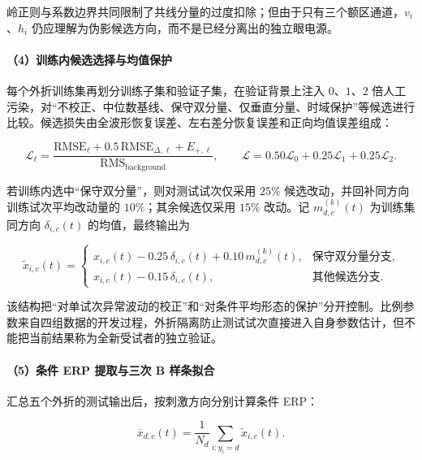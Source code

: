 \documentclass[a4paper]{ctexart}
\numberwithin{figure}{section}       %
\begin{document}
岭正则与系数边界共同限制了共线分量的过度扣除；但由于只有三个额区通道，$v_i$、$h_i$ 仍应理解为伪影候选方向，而不是已经分离出的独立眼电源。

\paragraph{（4）训练内候选选择与均值保护}

每个外折训练集再划分训练子集和验证子集，在验证背景上注入 $0$、$1$、$2$ 倍人工污染，对“不校正、中位数基线、保守双分量、仅垂直分量、时域保护”等候选进行比较。候选损失由全波形恢复误差、左右差分恢复误差和正向均值误差组成：

\begin{equation}
    \mathcal L_{\ell}=
    \frac{\mathrm{RMSE}_{\ell}+0.5\,\mathrm{RMSE}_{\Delta,\ell}+E_{+,\ell}}
    {\mathrm{RMS}_{\mathrm{background}}},
    \qquad
    \mathcal L=0.50\mathcal L_0+0.25\mathcal L_1+0.25\mathcal L_2.
    \label{eq:q1_selection}
\end{equation}

若训练内选中“保守双分量”，则对测试试次仅采用 $25\%$ 候选改动，并回补同方向训练试次平均改动量的 $10\%$；其余候选仅采用 $15\%$ 改动。记 $m^{(k)}_{d,c}(t)$ 为训练集同方向 $\delta_{i,c}(t)$ 的均值，最终输出为

\begin{equation}
    \tilde x_{i,c}(t)=
    \begin{cases}
        x_{i,c}(t)-0.25\,\delta_{i,c}(t)+0.10\,m^{(k)}_{d,c}(t),
        & \text{保守双分量分支},\\
        x_{i,c}(t)-0.15\,\delta_{i,c}(t),
        & \text{其他候选分支}.
    \end{cases}
    \label{eq:q1_meanprotect}
\end{equation}

该结构把“对单试次异常波动的校正”和“对条件平均形态的保护”分开控制。比例参数来自四组数据的开发过程，外折隔离防止测试试次直接进入自身参数估计，但不能把当前结果称为全新受试者的独立验证。

\paragraph{（5）条件 ERP 提取与三次 B 样条拟合}

汇总五个外折的测试输出后，按刺激方向分别计算条件 ERP：

\begin{equation}
    \overline{x}_{d,c}(t)=\frac{1}{N_d}
    \sum_{i:y_i=d}\tilde x_{i,c}(t).
    \label{eq:q1_erp}
\end{equation}
\end{document}

